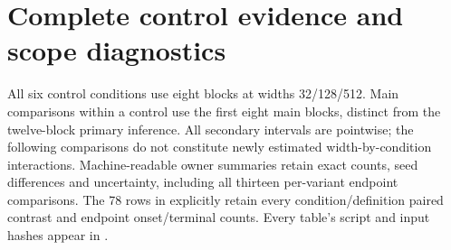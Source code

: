 \section{Complete control evidence and scope diagnostics}
\label{app:scope-displays}
All six control conditions use eight blocks at widths 32/128/512. Main comparisons within a control use the first eight main blocks, distinct from the twelve-block primary inference. All secondary intervals are pointwise; the following comparisons do not constitute newly estimated width-by-condition interactions. Machine-readable owner summaries retain exact counts, seed differences and uncertainty, including all thirteen per-variant endpoint comparisons. The 78 rows in  explicitly retain every condition/definition paired contrast and endpoint onset/terminal counts. Every table's script and input hashes appear in .

